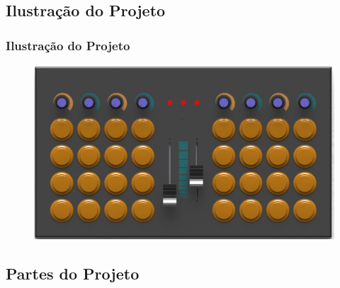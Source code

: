 \documentclass[hyperref={pdfpagelabels=false}]{beamer}
\begin{document}
        \subsection{Ilustração do Projeto}

             \begin{frame}\frametitle{Ilustração do Projeto}

                \begin{figure}
                    \includegraphics[scale=0.2]{Imagens/SW_Images/dalle_pad_montado2.png}
                \end{figure}

            \end{frame}

        \subsection{Partes do Projeto}
\end{document}
